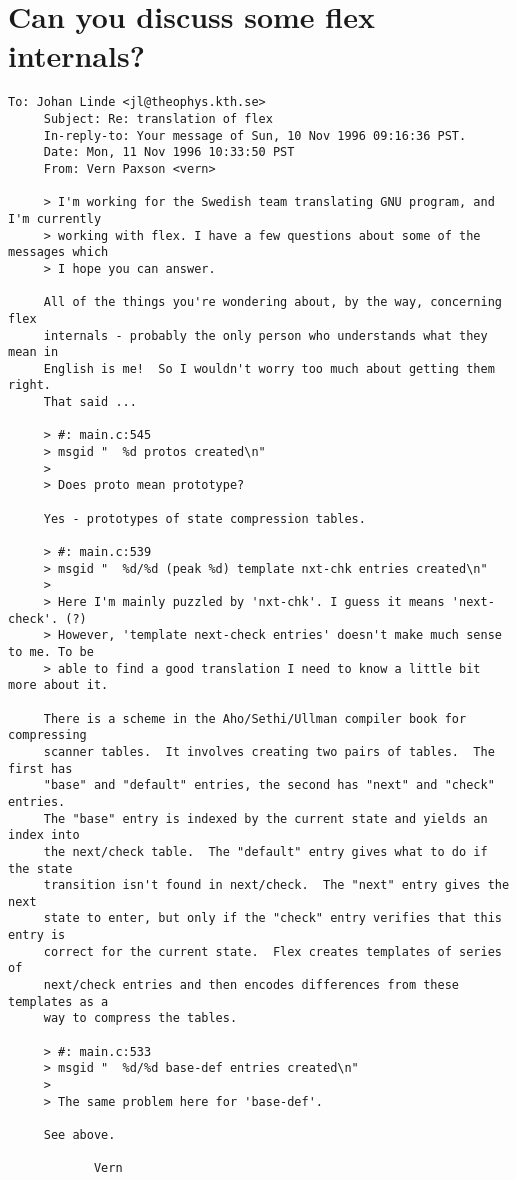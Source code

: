 \documentclass[openany,oneside]{book}
\begin{document}
\section{Can you discuss some flex internals?}

\begin{verbatim}
To: Johan Linde <jl@theophys.kth.se>
     Subject: Re: translation of flex
     In-reply-to: Your message of Sun, 10 Nov 1996 09:16:36 PST.
     Date: Mon, 11 Nov 1996 10:33:50 PST
     From: Vern Paxson <vern>
     
     > I'm working for the Swedish team translating GNU program, and I'm currently
     > working with flex. I have a few questions about some of the messages which
     > I hope you can answer.
     
     All of the things you're wondering about, by the way, concerning flex
     internals - probably the only person who understands what they mean in
     English is me!  So I wouldn't worry too much about getting them right.
     That said ...
     
     > #: main.c:545
     > msgid "  %d protos created\n"
     >
     > Does proto mean prototype?
     
     Yes - prototypes of state compression tables.
     
     > #: main.c:539
     > msgid "  %d/%d (peak %d) template nxt-chk entries created\n"
     >
     > Here I'm mainly puzzled by 'nxt-chk'. I guess it means 'next-check'. (?)
     > However, 'template next-check entries' doesn't make much sense to me. To be
     > able to find a good translation I need to know a little bit more about it.
     
     There is a scheme in the Aho/Sethi/Ullman compiler book for compressing
     scanner tables.  It involves creating two pairs of tables.  The first has
     "base" and "default" entries, the second has "next" and "check" entries.
     The "base" entry is indexed by the current state and yields an index into
     the next/check table.  The "default" entry gives what to do if the state
     transition isn't found in next/check.  The "next" entry gives the next
     state to enter, but only if the "check" entry verifies that this entry is
     correct for the current state.  Flex creates templates of series of
     next/check entries and then encodes differences from these templates as a
     way to compress the tables.
     
     > #: main.c:533
     > msgid "  %d/%d base-def entries created\n"
     >
     > The same problem here for 'base-def'.
     
     See above.
     
     		Vern
\end{verbatim}
\end{document}
